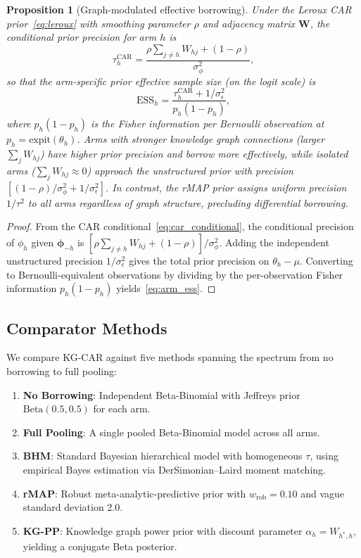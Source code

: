 \documentclass[12pt]{article}
\newtheorem{proposition}{Proposition}
\newcommand{\bphi}{\boldsymbol{\phi}}
\newcommand{\bW}{\mathbf{W}}
\begin{document}
\begin{proposition}[Graph-modulated effective borrowing]
\label{prop:ess}
Under the Leroux CAR prior~\eqref{eq:leroux} with smoothing parameter $\rho$ and adjacency matrix $\bW$, the conditional prior precision for arm $h$ is
\begin{equation}
\label{eq:arm_precision}
\tau_h^{\text{CAR}} = \frac{\rho \sum_{j \neq h} W_{hj} + (1-\rho)}{\sigma_\phi^2},
\end{equation}
so that the arm-specific prior effective sample size (on the logit scale) is
\begin{equation}
\label{eq:arm_ess}
\text{ESS}_h = \frac{\tau_h^{\text{CAR}} + 1/\sigma_\epsilon^2}{p_h(1-p_h)},
\end{equation}
where $p_h(1-p_h)$ is the Fisher information per Bernoulli observation at $p_h = \text{expit}(\theta_h)$. Arms with stronger knowledge graph connections (larger $\sum_j W_{hj}$) have higher prior precision and borrow more effectively, while isolated arms ($\sum_j W_{hj} \approx 0$) approach the unstructured prior with precision $[(1-\rho)/\sigma_\phi^2 + 1/\sigma_\epsilon^2]$. In contrast, the rMAP prior assigns uniform precision $1/\tau^2$ to all arms regardless of graph structure, precluding differential borrowing.
\end{proposition}

\begin{proof}
From the CAR conditional~\eqref{eq:car_conditional}, the conditional precision of $\phi_h$ given $\bphi_{-h}$ is $[\rho \sum_{j \neq h} W_{hj} + (1-\rho)] / \sigma_\phi^2$. Adding the independent unstructured precision $1/\sigma_\epsilon^2$ gives the total prior precision on $\theta_h - \mu$. Converting to Bernoulli-equivalent observations by dividing by the per-observation Fisher information $p_h(1-p_h)$ yields~\eqref{eq:arm_ess}.
\end{proof}

\subsection{Comparator Methods}
\label{sec:comparators}

We compare KG-CAR against five methods spanning the spectrum from no borrowing to full pooling:

\begin{enumerate}
\item \textbf{No Borrowing}: Independent Beta-Binomial with Jeffreys prior $\text{Beta}(0.5, 0.5)$ for each arm.
\item \textbf{Full Pooling}: A single pooled Beta-Binomial model across all arms.
\item \textbf{BHM}: Standard Bayesian hierarchical model with homogeneous $\tau$, using empirical Bayes estimation via DerSimonian--Laird moment matching.
\item \textbf{rMAP}: Robust meta-analytic-predictive prior \citep{schmidli2014robust} with $w_{\text{rob}} = 0.10$ and vague standard deviation 2.0.
\item \textbf{KG-PP}: Knowledge graph power prior with discount parameter $\alpha_h = W_{h^*, h}$, yielding a conjugate Beta posterior.
\end{enumerate}
\end{document}
